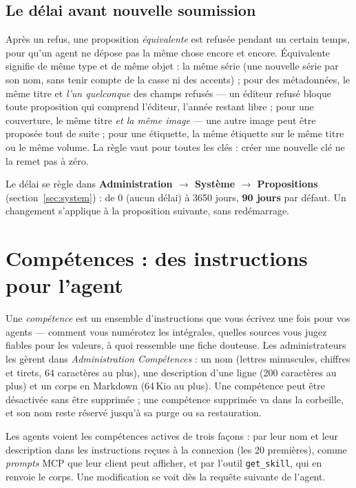 \subsection{Le délai avant nouvelle soumission}
\label{sec:agents-delay}

Après un refus, une proposition \emph{équivalente} est refusée pendant
un certain temps, pour qu'un agent ne dépose pas la même chose encore
et encore. Équivalente signifie de même type et de même objet : la
même série (une nouvelle série par son nom, sans tenir compte de la
casse ni des accents) ; pour des métadonnées, le même titre et
\emph{l'un quelconque} des champs refusés --- un éditeur refusé bloque
toute proposition qui comprend l'éditeur, l'année restant libre ; pour
une couverture, le même titre \emph{et la même image} --- une autre
image peut être proposée tout de suite ; pour une étiquette, la même
étiquette sur le même titre ou le même volume. La
règle vaut pour toutes les clés : créer une nouvelle clé ne la remet
pas à zéro.

Le délai se règle dans \textbf{Administration \(\rightarrow\) Système
\(\rightarrow\) Propositions}
(section~\ref{sec:system}) : de 0 (aucun délai) à 3650 jours,
\textbf{90 jours} par défaut. Un changement s'applique à la
proposition suivante, sans redémarrage.

\section{Compétences : des instructions pour l'agent}
\label{sec:agents-skills}

Une \emph{compétence} est un ensemble d'instructions que vous écrivez
une fois pour vos agents --- comment vous numérotez les intégrales,
quelles sources vous jugez fiables pour les valeurs, à quoi ressemble
une fiche douteuse. Les administrateurs les gèrent dans
\emph{Administration \textrightarrow{} Compétences} : un nom (lettres
minuscules, chiffres et tirets, 64 caractères au plus), une description
d'une ligne (200 caractères au plus) et un corps en Markdown (64\,Kio
au plus). Une compétence peut être désactivée sans être supprimée ; une
compétence supprimée va dans la corbeille, et son nom reste réservé
jusqu'à sa purge ou sa restauration.

Les agents voient les compétences actives de trois façons : par leur nom
et leur description dans les instructions reçues à la connexion (les 20
premières), comme \emph{prompts} MCP que leur client peut afficher, et
par l'outil \texttt{get\_skill}, qui en renvoie le corps. Une
modification se voit dès la requête suivante de l'agent.

